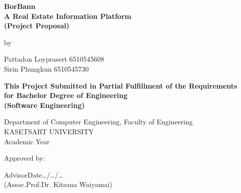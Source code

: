 \thispagestyle{empty}
\begin{center}
{\Large \textbf{BorBann\\A Real Estate Information Platform\\(Project Proposal)}}

\vspace{1cm}
{\large by}

\vspace{0.5cm}
{\large Pattadon Loyprasert 6510545608\\
Sirin Phungkun 6510545730}

\vspace{2cm}
{\large \textbf{This Project Submitted in Partial Fulfillment of the Requirements\\
for Bachelor Degree of Engineering\\
(Software Engineering)}}

\vspace{0.5cm}
{\large Department of Computer Engineering, Faculty of Engineering\\
KASETSART UNIVERSITY\\
Academic Year \graduationyear}
\end{center}

\vspace{3cm}
\noindent Approved by:

\vspace{1.5cm}
\noindent Advisor\dotfill Date\dots{}/\dots{}/\dots{}\\
\indent(Assoc.Prof.Dr. Kitsana Waiyamai)


\clearpage